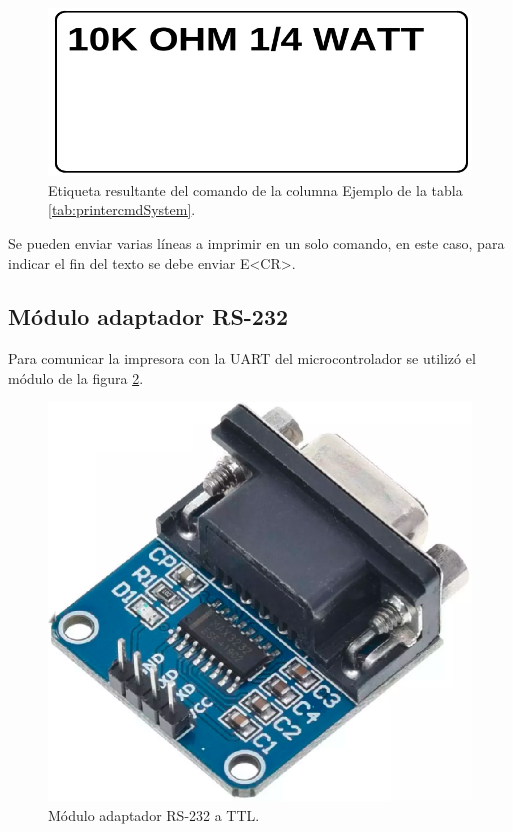 \begin{figure}[htpb]
	\centering
	\includegraphics[scale=0.3]{./Figures/label_ej.png}
	\caption{Etiqueta resultante del comando de la columna Ejemplo de la tabla \ref{tab:printercmdSystem}.}
	\label{fig:label_ej}
\end{figure}

Se pueden enviar varias líneas a imprimir en un solo comando, en este caso, para indicar el fin del texto se debe enviar E\textless{}CR\textgreater.

\subsection{Módulo adaptador RS-232}
\label{subsec:Mod232}
Para comunicar la impresora con la UART del microcontrolador se utilizó el módulo de la figura \ref{fig:rs232}. 

\begin{figure}[hb]
	\centering
	\includegraphics[scale=0.3]{./Figures/rs3232.png}
	\caption{Módulo adaptador RS-232 a TTL.}
	\label{fig:rs232}
\end{figure}

